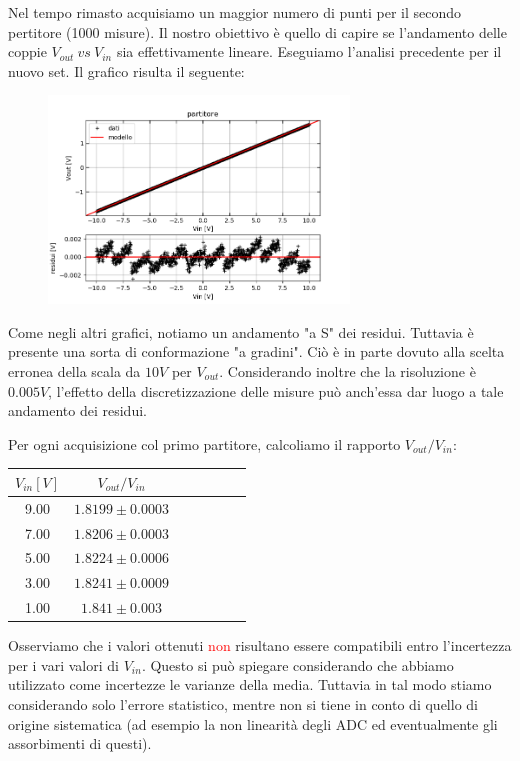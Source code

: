 Nel tempo rimasto acquisiamo un maggior numero di punti per il secondo pertitore (1000 misure). Il nostro obiettivo è quello di capire se l'andamento delle coppie $V_{out} \: vs \: V_{in}$ sia effettivamente lineare.
Eseguiamo l'analisi precedente per il nuovo set. Il grafico risulta il seguente:
\begin{figure}[H]
\caption{}
    \includegraphics[width=8cm]{settimana_1/immagini/Figure_5.png}
    \centering
\end{figure}

Come negli altri grafici, notiamo un andamento "a S" dei residui. Tuttavia è presente una sorta di conformazione "a gradini". Ciò è in parte dovuto alla scelta erronea della scala da $10V$ per $V_{out}$. Considerando inoltre che la risoluzione è $0.005V$, l'effetto della discretizzazione delle misure può anch'essa dar luogo a tale andamento dei residui.



Per ogni acquisizione col primo partitore, calcoliamo il rapporto $V_{out}/{V_{in}}$:
\begin{center}
\begin{tabular}{|c|c|c|c|c|c|c|}
\hline
$V_{in} [V]$          & $ {V_{out}/V_{in}}$ \\
\hline 
9.00         &    $1.8199 \pm 0.0003$   \\
7.00         &    $1.8206 \pm 0.0003$   \\
5.00         &    $1.8224 \pm 0.0006$   \\
3.00         &    $1.8241 \pm 0.0009$   \\
1.00         &    $1.841 \pm 0.003$   \\
\hline
\end{tabular}
\end{center}
Osserviamo che i valori ottenuti \textcolor{red}{non} risultano essere compatibili entro l'incertezza per i vari valori di $V_{in}$. Questo si può spiegare considerando che abbiamo utilizzato come incertezze le varianze della media. Tuttavia in tal modo stiamo considerando solo l'errore statistico, mentre non si tiene in conto di quello di origine sistematica (ad esempio la non linearità degli ADC ed eventualmente gli assorbimenti di questi).

